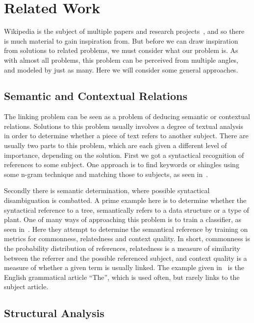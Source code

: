 \section{Related Work}\label{sec:related_work}

Wikipedia is the subject of multiple papers and research projects~\cite{wiki-research-newsletter}, and so there is much material to gain inspiration from. But before we can draw inspiration from solutions to related problems, we must consider what our problem is. As with almost all problems, this problem can be perceived from multiple angles, and modeled by just as many. Here we will consider some general approaches.

\subsection{Semantic and Contextual Relations}\label{related_semantic_contextual}

The linking problem can be seen as a problem of deducing semantic or contextual relations. Solutions to this problem usually involves a degree of textual analysis in order to determine whether a piece of text refers to another subject. There are usually two parts to this problem, which are each given a different level of importance, depending on the solution. First we got a syntactical recognition of references to some subject. One approach is to find keywords or shingles using some n-gram technique and matching those to subjects, as seen in~\cite{mihalcea2007wikify}. 

Secondly there is semantic determination, where possible syntactical disambiguation is combatted. A prime example here is to determine whether the syntactical reference to a tree, semantically refers to a data structure or a type of plant. One of many ways of approaching this problem is to train a classifier, as seen in~\cite{milne2008learning}. Here they attempt to determine the semantical  reference by training on metrics for commonness, relatedness and context quality. In short, commonness is the probability distribution of references, relatedness is a measure of similarity between the referrer and the possible referenced subject, and context quality is a measure of whether a given term is usually linked. The example given in~\cite{milne2008learning} is the English grammatical article \enquote{The}, which is used often, but rarely links to the subject article.

\subsection{Structural Analysis}\label{related_structural_analysis}

